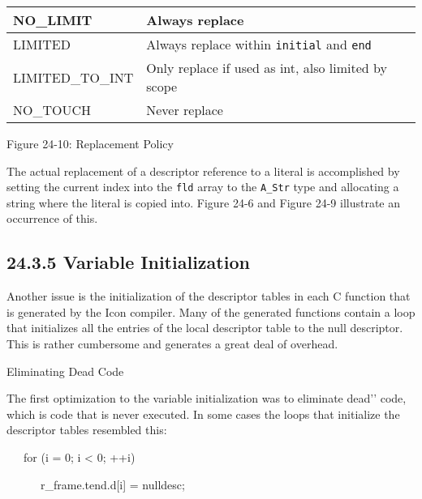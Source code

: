 \begin{center}
\tabletail{}
\tablelasttail{}
\begin{supertabular}{|m{1.4670599in}|m{3.2670598in}|}
\hline
{\ttfamily NO\_LIMIT} &
 Always replace\\\hline
{\ttfamily LIMITED} &
 Always replace within \texttt{initial} and \texttt{end}\\\hline
{\ttfamily LIMITED\_TO\_INT} &
 Only replace if used as int, also limited by scope\\\hline
{\ttfamily NO\_TOUCH} &
 Never replace\\\hline
\end{supertabular}
\end{center}
{\centering{}
Figure 24-10: Replacement Policy
\par}


The actual replacement of a descriptor reference to a literal is
accomplished by setting the current index into the \texttt{fld} array
to the \texttt{A\_Str} type and allocating a string where the literal
is copied into. Figure 24-6 and Figure 24-9 illustrate an occurrence
of this.

\subsection[24.3.5 Variable Initialization]{24.3.5 Variable Initialization}

Another issue is the initialization of the descriptor tables in each C
function that is generated by the Icon compiler.  Many of the
generated functions contain a loop that initializes all the entries of
the local descriptor table to the null descriptor. This is rather
cumbersome and generates a great deal of overhead.

{\sffamily
Eliminating Dead Code}


The first optimization to the variable initialization was to eliminate
{\textasciigrave}{\textasciigrave}dead'{}' code, which is code that is
never executed. In some cases the loops that initialize the
descriptor tables resembled this:

{\ttfamily\mdseries
\ \ \ for (i = 0; i {\textless} 0; ++i)}

{\ttfamily\mdseries
\ \ \ \ \ \ r\_frame.tend.d[i] = nulldesc;}


